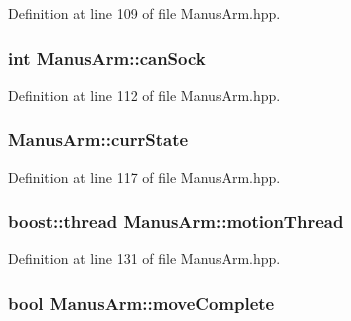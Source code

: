 \-Definition at line 109 of file \-Manus\-Arm.\-hpp.

\subsubsection[{can\-Sock}]{\setlength{\rightskip}{0pt plus 5cm}int {\bf \-Manus\-Arm\-::can\-Sock}\hspace{0.3cm}{\ttfamily  [private]}}\label{classManusArm_a2aca70c56fae01836147fb6fbe05d292}


\-Definition at line 112 of file \-Manus\-Arm.\-hpp.

\subsubsection[{curr\-State}]{ {\bf \-Manus\-Arm\-::curr\-State}\hspace{0.3cm}{\ttfamily  [private]}}\label{classManusArm_a9af73ad8208aaed94c4319081efeadb0}


\-Definition at line 117 of file \-Manus\-Arm.\-hpp.

\subsubsection[{motion\-Thread}]{\setlength{\rightskip}{0pt plus 5cm}boost\-::thread {\bf \-Manus\-Arm\-::motion\-Thread}\hspace{0.3cm}{\ttfamily  [private]}}\label{classManusArm_a5de1755d7b642cba75ac858610f62915}


\-Definition at line 131 of file \-Manus\-Arm.\-hpp.

\subsubsection[{move\-Complete}]{\setlength{\rightskip}{0pt plus 5cm}bool {\bf \-Manus\-Arm\-::move\-Complete}\hspace{0.3cm}{\ttfamily  [private]}}\label{classManusArm_ae7596bcc4efbf188e2999e9488a60043}


